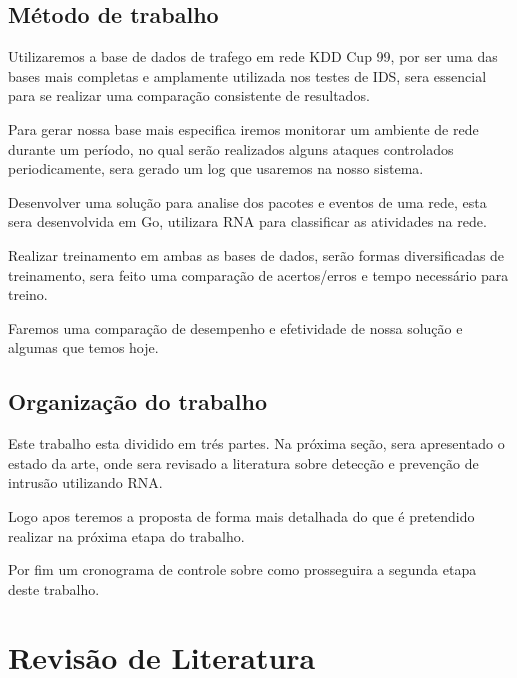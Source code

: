 \documentclass[
	12pt,				%
	openright,			%
	oneside,
	a4paper,			%
	english,			%
	french,				%
	spanish,			%
	brazil				%
	]{abntex2}
\begin{document}
\section{Método de trabalho}

Utilizaremos a base de dados de trafego em rede KDD Cup 99, por ser uma das bases mais completas e amplamente utilizada nos testes de IDS, sera essencial para se realizar uma comparação consistente de resultados.

Para gerar nossa base mais especifica iremos monitorar um ambiente de rede durante um período, no qual serão realizados alguns ataques controlados periodicamente, sera gerado um log que usaremos na nosso sistema.

Desenvolver uma solução para analise dos pacotes e eventos de uma rede, esta sera desenvolvida em Go, utilizara RNA para classificar as atividades na rede.

Realizar treinamento em ambas as bases de dados, serão formas diversificadas de treinamento, sera feito uma comparação de acertos/erros e tempo necessário para treino.

Faremos uma comparação de desempenho e efetividade de nossa solução e algumas que temos hoje.

\section{Organização do trabalho}

Este trabalho esta dividido em trés partes.
Na próxima seção, sera apresentado o estado da arte, onde sera revisado a literatura sobre detecção e prevenção de intrusão utilizando RNA.

Logo apos teremos a proposta  de forma mais detalhada do que é pretendido realizar na próxima etapa do trabalho.

Por fim um cronograma de controle sobre como prosseguira a segunda etapa deste trabalho.


\chapter[Revisão de Literatura]{Revisão de Literatura}
\end{document}

